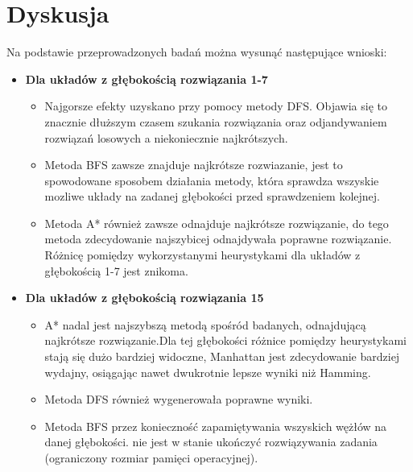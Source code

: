\documentclass{classrep}
\begin{document}
    \section{Dyskusja}
    {

        Na podstawie przeprowadzonych badań można wysunąć następujące wnioski:
         \begin{itemize}
         \setlength\itemsep{1em}
            \item {\textbf{Dla układów z głębokością rozwiązania 1-7}}
                \begin{itemize}

                    \item{Najgorsze efekty uzyskano przy pomocy metody DFS.
            Objawia się to znacznie dłuższym czasem szukania rozwiązania oraz odjandywaniem rozwiązań losowych a niekoniecznie najkrótszych.}

                    \item{ Metoda BFS zawsze znajduje najkrótsze rozwiazanie, jest to spowodowane sposobem działania metody, która sprawdza wszyskie mozliwe układy na zadanej głębokości przed sprawdzeniem kolejnej.}

                    \item{Metoda A* również zawsze odnajduje najkrótsze rozwiązanie, do tego metoda zdecydowanie najszybicej odnajdywała poprawne rozwiązanie.
            Różnicę pomiędzy wykorzystanymi heurystykami dla układów z głębokością 1-7 jest znikoma.}
                \end{itemize}
            \item {\textbf{Dla układów z głębokością rozwiązania 15}}
                 \begin{itemize}

                    \item { A* nadal jest najszybszą metodą spośród badanych, odnajdującą najkrótsze rozwiązanie.Dla tej głębokości różnice pomiędzy heurystykami stają się dużo bardziej widoczne, Manhattan jest zdecydowanie bardziej wydajny, osiągając nawet dwukrotnie lepsze wyniki niż Hamming.}

                    \item{Metoda DFS również wygenerowała poprawne wyniki.}

                    \item{Metoda BFS przez konieczność zapamiętywania wszyskich wężłów na danej głębokości.
            nie jest w stanie ukończyć rozwiązywania zadania (ograniczony rozmiar pamięci operacyjnej).}
                \end{itemize}
            \end{itemize}

      }\label{sec:dyskusja}
\end{document}
